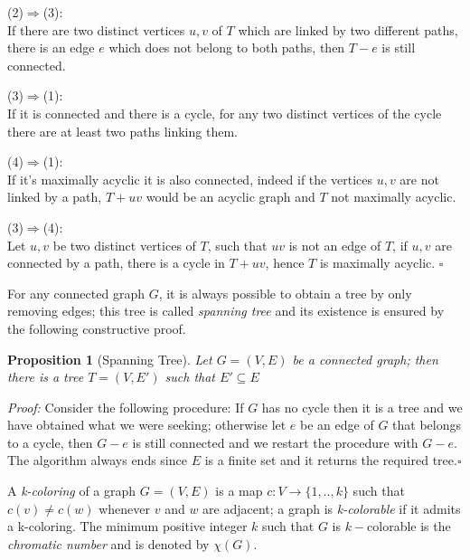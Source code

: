 \documentclass[a4paper,12pt,oneside]{book}
\newtheorem{proposition}[theorem]{Proposition}
\newcommand*{\QED}{\hfill\ensuremath{\square}}
\begin{document}
(2)$\Rightarrow$(3):\\
If there are two distinct vertices $u,v$ of $T$ which are linked by two different  paths, there is an edge $e$ which does not belong to both paths, then $T-e$ is still connected.

(3)$\Rightarrow$(1):\\
If it is connected and there is a cycle, for any two distinct vertices of the cycle there  are at least two paths linking them.

(4)$\Rightarrow$(1):\\
If it's maximally acyclic it is also connected, indeed if the vertices $u,v$ are not linked by a path, $T+uv$ would be an acyclic graph and $T$ not maximally acyclic. 

(3)$\Rightarrow$(4):\\
Let $u,v$ be two distinct vertices of $T$, such that $uv$ is not an edge of $T$, if $u,v$ are connected by a path, there is a cycle in $T+uv$, hence $T$ is maximally acyclic. \QED

 For any connected graph $G$, it is always possible to obtain a tree by only removing edges; this tree is called \textit{spanning tree} and its existence is ensured by the following constructive proof.
\begin{proposition}[Spanning Tree]
Let $G=(V,E)$ be a connected graph; then there is a tree $T=(V,E')$ such that $E'\subseteq E$
\end{proposition}
\textit{Proof:}
Consider the following procedure: If $G$ has no cycle then it is a tree and we have obtained what we were seeking; otherwise let $e$ be an edge of $G$ that belongs to a cycle, then $G-e$ is still connected and we restart the procedure with $G-e$.
The algorithm always ends since $E$ is a finite set and it returns the required tree.\QED


A \textit{k-coloring} of a graph $G=(V,E)$ is a map $c:V \rightarrow \{1,..,k\} $ such that $c(v) \neq c(w) $ whenever $v$ and $w$ are adjacent; a graph is \textit{k-colorable} if it admits a k-coloring. The minimum positive integer $k$ such that $G$ is $k-$colorable is the \textit{chromatic number} and is denoted by $\chi (G)$.
\end{document}
